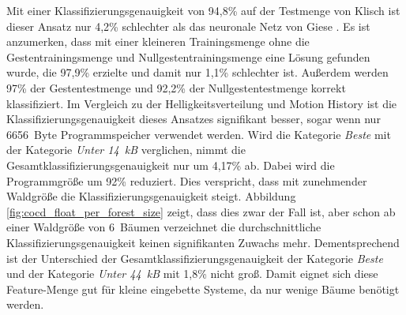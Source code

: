 Mit einer Klassifizierungsgenauigkeit von 94,8\% auf der Testmenge von Klisch ist dieser Ansatz nur 4,2\% schlechter als das neuronale Netz von Giese \cite{gieseThesis}. Es ist anzumerken, dass mit einer
kleineren Trainingsmenge ohne die Gestentrainingsmenge und Nullgestentrainingsmenge eine Lösung gefunden wurde, die 97,9\% erzielte und damit nur 1,1\% schlechter ist.
Außerdem werden 97\% der Gestentestmenge und 92,2\% der Nullgestentestmenge korrekt klassifiziert.
\newline
\newline
Im Vergleich zu der Helligkeitsverteilung und Motion History ist die Klassifizierungsgenauigkeit dieses Ansatzes signifikant besser, sogar wenn nur 6656~Byte Programmspeicher verwendet werden.
Wird die Kategorie \textit{Beste} mit der Kategorie \textit{Unter 14~kB} verglichen, nimmt die Gesamtklassifizierungsgenauigkeit nur um 4,17\% ab. Dabei wird die Programmgröße um 92\% reduziert.
Dies verspricht, dass mit zunehmender Waldgröße die Klassifizierungsgenauigkeit steigt. Abbildung \ref{fig:cocd_float_per_forest_size} zeigt, dass dies zwar der Fall ist, aber schon ab einer Waldgröße von
6~Bäumen verzeichnet die durchschnittliche Klassifizierungsgenauigkeit keinen signifikanten Zuwachs mehr. Dementsprechend ist der Unterschied der Gesamtklassifizierungsgenauigkeit der Kategorie \textit{Beste}
und der Kategorie \textit{Unter 44~kB} mit 1,8\% nicht groß. Damit eignet sich diese Feature-Menge gut für kleine eingebette Systeme, da nur wenige Bäume benötigt werden.